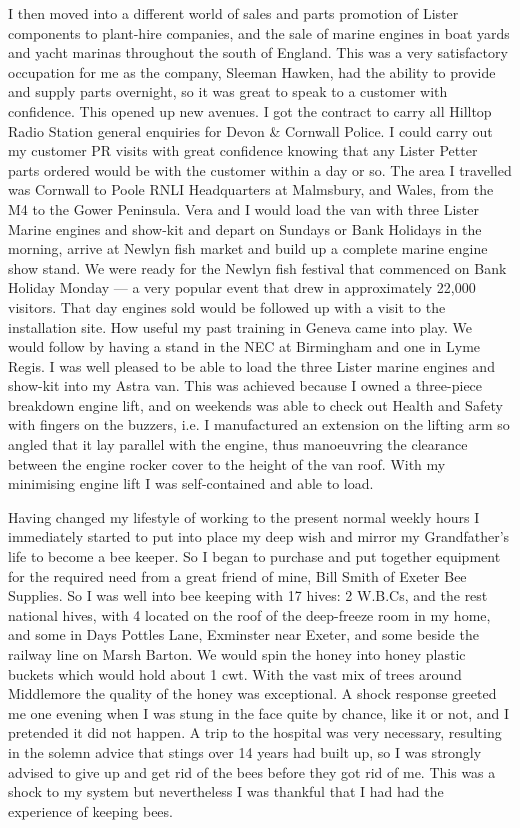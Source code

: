 I then moved into a different world of sales and parts promotion of Lister
components to plant-hire companies, and the sale of marine engines in boat
yards and yacht marinas throughout the south of England. This was a very
satisfactory occupation for me as the company, Sleeman Hawken, had the ability
to provide and supply parts overnight, so it was great to speak to a customer
with confidence. This opened up new avenues. I got the contract to carry all
Hilltop Radio Station general enquiries for Devon \& Cornwall Police. I could
carry out my customer PR visits with great confidence knowing that any Lister
Petter parts ordered would be with the customer within a day or so. The area I
travelled was Cornwall to Poole RNLI Headquarters at Malmsbury, and Wales, from
the M4 to the Gower Peninsula. Vera and I would load the van with three Lister
Marine engines and show-kit and depart on Sundays or Bank Holidays in the
morning, arrive at Newlyn fish market and build up a complete marine engine
show stand. We were ready for the Newlyn fish festival that commenced on Bank
Holiday Monday --- a very popular event that drew in approximately 22,000
visitors. That day engines sold would be followed up with a visit to the
installation site. How useful my past training in Geneva came into play. We
would follow by having a stand in the NEC at Birmingham and one in Lyme Regis.
I was well pleased to be able to load the three Lister marine engines and
show-kit into my Astra van. This was achieved because I owned a three-piece
breakdown engine lift, and on weekends was able to check out Health and Safety
with fingers on the buzzers, i.e. I manufactured an extension on the lifting
arm so angled that it lay parallel with the engine, thus manoeuvring the
clearance between the engine rocker cover to the height of the van roof. With
my minimising engine lift I was self-contained and able to load.

Having changed my lifestyle of working to the present normal weekly hours I
immediately started to put into place my deep wish and mirror my Grandfather's
life to become a bee keeper. So I began to purchase and put together equipment
for the required need from a great friend of mine, Bill Smith of Exeter Bee
Supplies. So I was well into bee keeping with 17 hives: 2 W.B.Cs, and the rest
national hives, with 4 located on the roof of the deep-freeze room in my home,
and some in Days Pottles Lane, Exminster near Exeter, and some beside the
railway line on Marsh Barton. We would spin the honey into honey plastic
buckets which would hold about 1 cwt. With the vast mix of trees around
Middlemore the quality of the honey was exceptional. A shock response greeted
me one evening when I was stung in the face quite by chance, like it or not,
and I pretended it did not happen. A trip to the hospital was very necessary,
resulting in the solemn advice that stings over 14 years had built up, so I was
strongly advised to give up and get rid of the bees before they got rid of me.
This was a shock to my system but nevertheless I was thankful that I had had
the experience of keeping bees.



